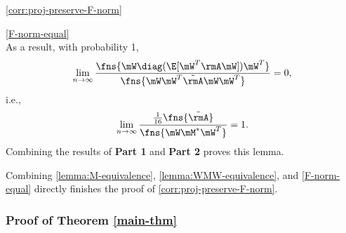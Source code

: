 \begin{proofof}{\cref{corr:proj-preserve-F-norm}}
\begin{proofof}{\cref{F-norm-equal}}
\begin{equation}
\end{equation}
As a result, with probability 1,
\begin{equation}
\lim_{n\to\infty}\frac{\fns{\mW\diag(\E[\mW^T\rmA\mW])\mW^T}}{\fns{\mW\mW^T\tilde{\rmA}\mW\mW^T}} = 0,
\end{equation}
i.e.,
\begin{equation}
\lim_{n\to\infty}\frac{\frac{1}{16}\fns{\tilde{\rmA}}}{\fns{\mW\mM^*\mW^T}} = 1.
\end{equation}
Combining the results of \textbf{Part 1} and \textbf{Part 2} proves this lemma.
\end{proofof}
Combining \cref{lemma:M-equivalence}, \cref{lemma:WMW-equivalence}, and \cref{F-norm-equal} directly finishes the proof of \cref{corr:proj-preserve-F-norm}.
\end{proofof}

\subsubsection{Proof of Theorem \cref{main-thm}}
\label{proof-main-thm}


